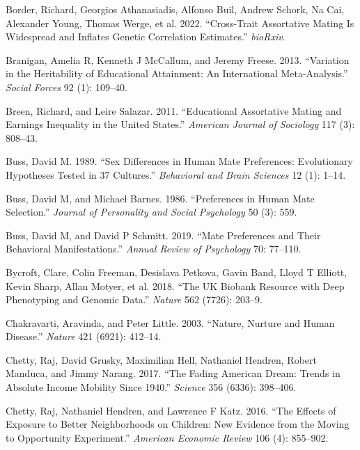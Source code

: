 \documentclass[
]{article}
\newlength{\cslhangindent}
\newlength{\cslentryspacingunit} %
\newenvironment{CSLReferences}[2] %
 {%
  \setlength{\parindent}{0pt}
  \ifodd #1
  \let\oldpar\par
  \def\par{\hangindent=\cslhangindent\oldpar}
  \fi
  \setlength{\parskip}{#2\cslentryspacingunit}
 }%
 {}
\theoremstyle{definition}
\theoremstyle{definition}
\theoremstyle{definition}
\theoremstyle{definition}
\theoremstyle{remark}
\begin{document}
\begin{CSLReferences}{1}{0}
\leavevmode{}%
Border, Richard, Georgios Athanasiadis, Alfonso Buil, Andrew Schork, Na Cai, Alexander Young, Thomas Werge, et al. 2022. {``Cross-Trait Assortative Mating Is Widespread and Inflates Genetic Correlation Estimates.''} \emph{bioRxiv}.

\leavevmode{}%
Branigan, Amelia R, Kenneth J McCallum, and Jeremy Freese. 2013. {``Variation in the Heritability of Educational Attainment: An International Meta-Analysis.''} \emph{Social Forces} 92 (1): 109--40.

\leavevmode{}%
Breen, Richard, and Leire Salazar. 2011. {``Educational Assortative Mating and Earnings Inequality in the United States.''} \emph{American Journal of Sociology} 117 (3): 808--43.

\leavevmode{}%
Buss, David M. 1989. {``Sex Differences in Human Mate Preferences: Evolutionary Hypotheses Tested in 37 Cultures.''} \emph{Behavioral and Brain Sciences} 12 (1): 1--14.

\leavevmode{}%
Buss, David M, and Michael Barnes. 1986. {``Preferences in Human Mate Selection.''} \emph{Journal of Personality and Social Psychology} 50 (3): 559.

\leavevmode{}%
Buss, David M, and David P Schmitt. 2019. {``Mate Preferences and Their Behavioral Manifestations.''} \emph{Annual Review of Psychology} 70: 77--110.

\leavevmode{}%
Bycroft, Clare, Colin Freeman, Desislava Petkova, Gavin Band, Lloyd T Elliott, Kevin Sharp, Allan Motyer, et al. 2018. {``The UK Biobank Resource with Deep Phenotyping and Genomic Data.''} \emph{Nature} 562 (7726): 203--9.

\leavevmode{}%
Chakravarti, Aravinda, and Peter Little. 2003. {``Nature, Nurture and Human Disease.''} \emph{Nature} 421 (6921): 412--14.

\leavevmode{}%
Chetty, Raj, David Grusky, Maximilian Hell, Nathaniel Hendren, Robert Manduca, and Jimmy Narang. 2017. {``The Fading American Dream: Trends in Absolute Income Mobility Since 1940.''} \emph{Science} 356 (6336): 398--406.

\leavevmode{}%
Chetty, Raj, Nathaniel Hendren, and Lawrence F Katz. 2016. {``The Effects of Exposure to Better Neighborhoods on Children: New Evidence from the Moving to Opportunity Experiment.''} \emph{American Economic Review} 106 (4): 855--902.


\end{CSLReferences}
\end{document}
